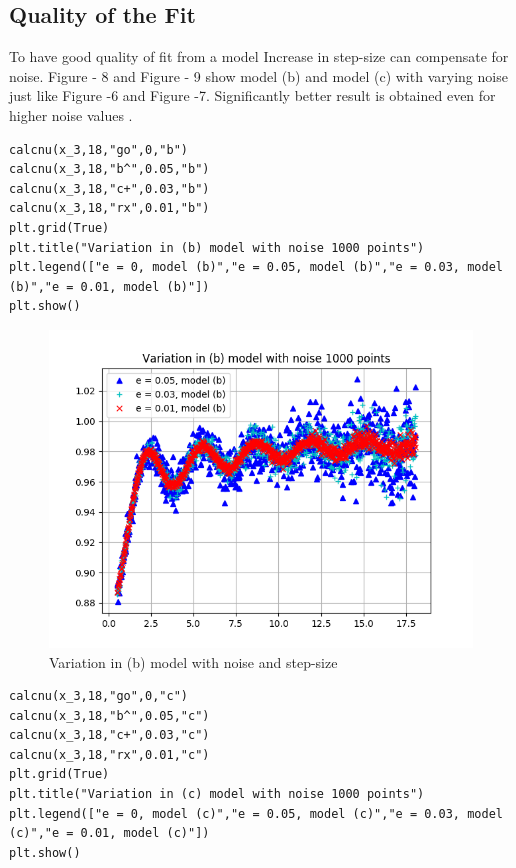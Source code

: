 \documentclass[a4paper]{article}
\begin{document}
\subsection{Quality of the Fit}
To have good quality of fit from a model Increase in step-size can compensate for noise. Figure - 8 and Figure - 9 show model (b) and model (c) with varying noise just like Figure -6 and Figure -7. Significantly better result is obtained even for higher noise values .  
\begin{lstlisting}
calcnu(x_3,18,"go",0,"b")
calcnu(x_3,18,"b^",0.05,"b")
calcnu(x_3,18,"c+",0.03,"b")
calcnu(x_3,18,"rx",0.01,"b")
plt.grid(True)
plt.title("Variation in (b) model with noise 1000 points")
plt.legend(["e = 0, model (b)","e = 0.05, model (b)","e = 0.03, model (b)","e = 0.01, model (b)"])
plt.show()
\end{lstlisting}

\begin{figure}
\includegraphics[width=\columnwidth]{Figure_1-7.png}
\caption{Variation in (b) model with noise and step-size}
\end{figure}

\begin{lstlisting}
calcnu(x_3,18,"go",0,"c")
calcnu(x_3,18,"b^",0.05,"c")
calcnu(x_3,18,"c+",0.03,"c")
calcnu(x_3,18,"rx",0.01,"c")
plt.grid(True)
plt.title("Variation in (c) model with noise 1000 points")
plt.legend(["e = 0, model (c)","e = 0.05, model (c)","e = 0.03, model (c)","e = 0.01, model (c)"])
plt.show()
\end{lstlisting}
\end{document}

